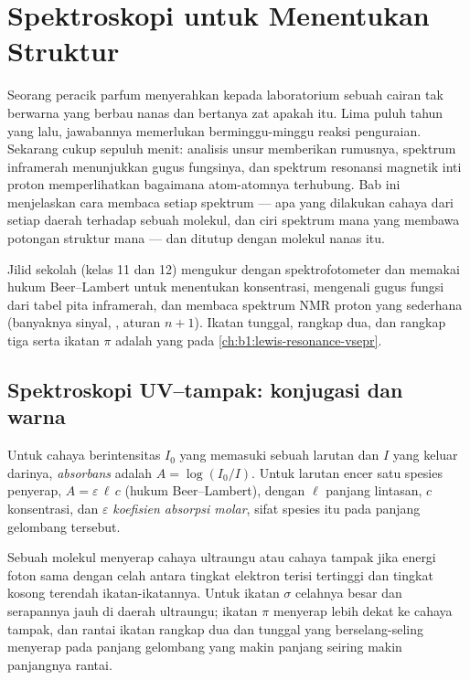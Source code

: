 \chapter{Spektroskopi untuk Menentukan Struktur}\label{ch:b1:structure-spectroscopy}

Seorang peracik parfum menyerahkan kepada laboratorium sebuah cairan tak
berwarna yang berbau nanas dan bertanya zat apakah itu. Lima puluh tahun
yang lalu, jawabannya memerlukan berminggu-minggu reaksi penguraian.
Sekarang cukup sepuluh menit: analisis unsur memberikan rumusnya,
spektrum inframerah menunjukkan gugus fungsinya, dan spektrum resonansi
magnetik inti proton memperlihatkan bagaimana atom-atomnya terhubung.
Bab ini menjelaskan cara membaca setiap spektrum --- apa yang dilakukan
cahaya dari setiap daerah terhadap sebuah molekul, dan ciri spektrum
mana yang membawa potongan struktur mana --- dan ditutup dengan molekul
nanas itu.

\begin{recall}
Jilid sekolah (kelas 11 dan 12) mengukur  dengan
spektrofotometer dan memakai hukum Beer--Lambert untuk menentukan
konsentrasi, mengenali gugus fungsi dari tabel pita inframerah, dan
membaca spektrum NMR proton yang sederhana (banyaknya sinyal, ,
aturan $n + 1$). Ikatan tunggal, rangkap dua, dan rangkap tiga serta
ikatan $\pi$ adalah yang pada \cref{ch:b1:lewis-resonance-vsepr}.
\end{recall}

\section{Spektroskopi UV--tampak: konjugasi dan warna}

\begin{definition}\label{def:b1:structure-spectroscopy:absorbance}
Untuk cahaya berintensitas $I_0$ yang memasuki sebuah larutan dan $I$
yang keluar darinya, \emph{absorbans} adalah
$A = \log(I_0/I)$. Untuk larutan encer satu spesies penyerap,
$A = \varepsilon\,\ell\,c$ (hukum Beer--Lambert), dengan $\ell$ panjang
lintasan, $c$ konsentrasi, dan $\varepsilon$ \emph{koefisien absorpsi
molar}, sifat spesies itu pada panjang
gelombang tersebut.
\end{definition}

Sebuah molekul menyerap cahaya ultraungu atau cahaya tampak jika energi
foton sama dengan celah antara tingkat elektron terisi tertinggi dan
tingkat kosong terendah ikatan-ikatannya. Untuk ikatan $\sigma$ celahnya
besar dan serapannya jauh di daerah ultraungu; ikatan $\pi$ menyerap
lebih dekat ke cahaya tampak, dan rantai ikatan rangkap dua dan tunggal
yang berselang-seling menyerap pada panjang gelombang yang makin panjang
seiring makin panjangnya rantai.

